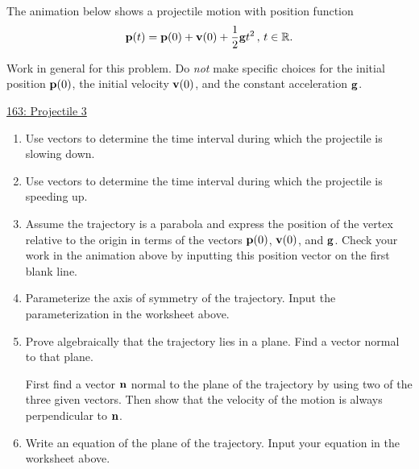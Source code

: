 \documentclass{ximera}
\begin{document}
\begin{question}  \label{Q454rft4t4t}
The animation below shows a projectile motion with position function
\[
    {\bf p}(t) = {\bf p}(0) + {\bf v}(0) + \frac{1}{2}{\bf g}t^2 \, , \, t \in \mathbb{R} .
\]

Work in general for this problem. Do \emph{not} make specific choices for the initial position ${\bf p}(0)$, the initial velocity ${\bf v}(0)$, and the constant acceleration ${\bf g}$. 

\begin{onlineOnly}
    \begin{center}
\end{center}
\end{onlineOnly}

\href{https://www.desmos.com/3d/clr4mdmltt}{163: Projectile 3}

\begin{enumerate}
\item Use vectors to determine the time interval during which the projectile is slowing down. 

\item Use vectors to determine the time interval during which the projectile is speeding up. 

\item Assume the trajectory is a parabola and express the position of the vertex relative to the origin in terms of the vectors ${\bf p}(0)$, ${\bf v}(0)$, and ${\bf g}$. Check  your work in the animation above by inputting this position vector on the first blank line.

\item Parameterize the axis of symmetry of the trajectory. Input the parameterization in the worksheet above.

\item Prove algebraically that the trajectory lies in a plane. Find a vector normal to that plane.

\begin{hint}
First find a vector ${\bf n}$ normal to the plane of the trajectory by using two of the three given vectors. Then show that the velocity of the motion is always perpendicular to ${\bf n}$.
\end{hint}


\item Write an equation of the plane of the trajectory. Input your equation in the worksheet above.

\end{enumerate}


\end{question}
\end{document}
